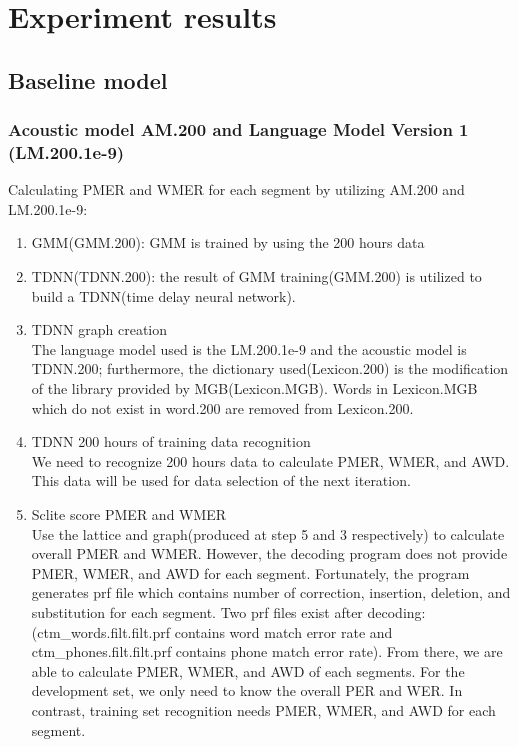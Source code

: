 \chapter{Experiment results}


\section{Baseline model}

\subsection{Acoustic model AM.200 and Language Model Version 1 (LM.200.1e-9)}
\label{amv0s1}


Calculating PMER and WMER for each segment by utilizing AM.200 and LM.200.1e-9:
\begin{enumerate}
\item GMM(GMM.200): GMM is trained by using the 200 hours data
\item TDNN(TDNN.200): the result of GMM training(GMM.200) is utilized to build a TDNN(time delay neural network). 
\item TDNN graph creation \\
The language model used is the LM.200.1e-9 and  the acoustic model is  TDNN.200; furthermore, the dictionary used(Lexicon.200) is the modification of the library provided by MGB(Lexicon.MGB). Words in Lexicon.MGB which do not exist in word.200 are removed from Lexicon.200.
\item TDNN 200 hours of training data recognition \\
We need to recognize 200 hours data to calculate PMER, WMER, and AWD. This data will be used for data selection of the next iteration.
\item Sclite score PMER and WMER \\
Use the lattice and graph(produced at step 5 and 3 respectively) to calculate overall PMER and WMER. However, the decoding program does not provide PMER, WMER, and AWD for each segment. Fortunately, the program generates prf file which contains number of correction, insertion, deletion, and substitution for each segment. Two prf files exist after decoding:(ctm\_words.filt.filt.prf contains word match error rate and ctm\_phones.filt.filt.prf contains phone match error rate). From there, we are able to calculate  PMER, WMER, and AWD of each segments.  For the development set, we only need to know the overall PER and WER. In contrast, training set recognition needs PMER, WMER, and AWD for each segment. 

\end{enumerate}


